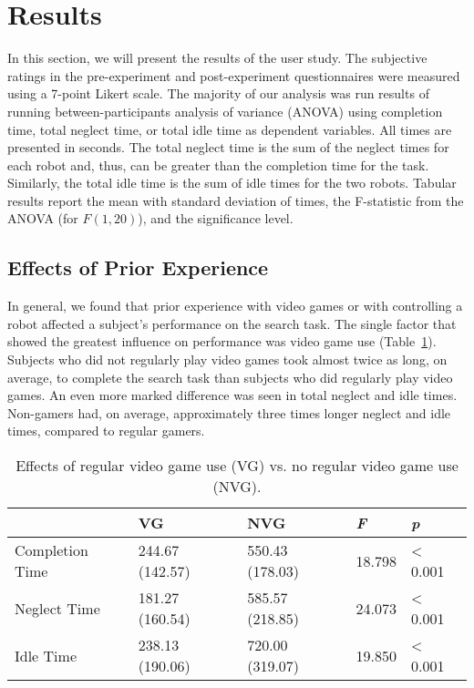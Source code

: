 \section{Results}
\label{sec:study-results}
In this section, we will present the results of the user study. The subjective ratings in the pre-experiment and post-experiment questionnaires were measured using a 7-point Likert scale. The majority of our analysis was run results of running between-participants analysis of variance (ANOVA) using completion time, total neglect time, or total idle time as dependent variables. All times are presented in seconds. The total neglect time is the sum of the neglect times for each robot and, thus, can be greater than the completion time for the task. Similarly, the total idle time is the sum of idle times for the two robots. Tabular results report the mean with standard deviation of times, the F-statistic from the ANOVA (for $F(1, 20)$), and the significance level.

\subsection{Effects of Prior Experience} %
\label{sub:effects_of_prior_experience}
In general, we found that prior experience with video games or with controlling a robot affected a subject’s performance on the search task.
The single factor that showed the greatest influence on performance was video game use (Table~\ref{tab:prior-vg}). Subjects who did not regularly play video games took almost twice as long, on average, to complete the search task than subjects who did regularly play video games. An even more marked difference was seen in total neglect and idle times. Non-gamers had, on average, approximately three times longer neglect and idle times, compared to regular gamers.


\begin{table}[ht]
\label{tab:prior-vg}
\begin{center}
	\begin{tabular}{| l | l | l | l | l |}
	\hline
		& \textbf{VG} & \textbf{NVG} & \emph{F} & \emph{p}\\ \hline
		Completion Time & 244.67 (142.57) & 550.43 (178.03) & 18.798 & < 0.001\\ \hline
		Neglect Time & 181.27 (160.54) & 585.57 (218.85) & 24.073 & < 0.001\\ \hline
		Idle Time & 238.13 (190.06) & 720.00 (319.07) & 19.850 & < 0.001\\ \hline
	\hline
	\end{tabular}
	\caption{Effects of regular video game use (VG) vs. no regular video game use (NVG).}
\end{center}
\end{table}


